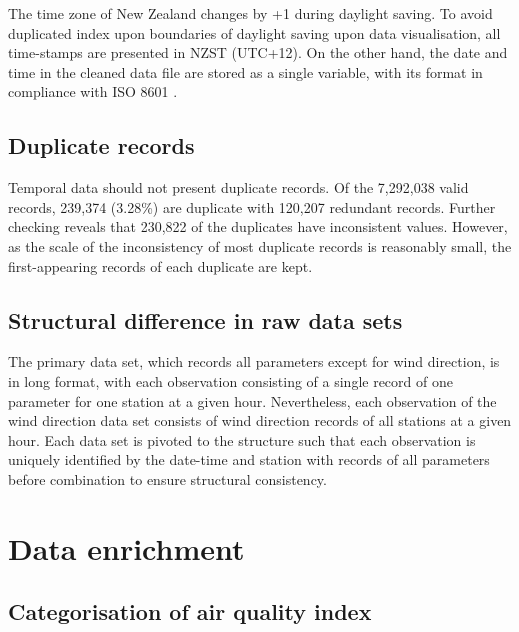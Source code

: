 \documentclass{aucklandthesis}
\begin{document}
The time zone of New Zealand changes by +1 during daylight saving. To avoid duplicated index upon boundaries of daylight saving upon data visualisation, all time-stamps are presented in NZST (UTC+12). On the other hand, the date and time in the cleaned data file are stored as a single variable, with its format in compliance with ISO 8601 \autocite{iso8601,readr}.

\hypertarget{duplicate-records}{%
\subsection{Duplicate records}\label{duplicate-records}}

Temporal data should not present duplicate records. Of the 7,292,038 valid records, 239,374 (3.28\%) are duplicate with 120,207 redundant records. Further checking reveals that 230,822 of the duplicates have inconsistent values. However, as the scale of the inconsistency of most duplicate records is reasonably small, the first-appearing records of each duplicate are kept.

\hypertarget{structural-difference-in-raw-data-sets}{%
\subsection{Structural difference in raw data sets}\label{structural-difference-in-raw-data-sets}}

The primary data set, which records all parameters except for wind direction, is in long format, with each observation consisting of a single record of one parameter for one station at a given hour. Nevertheless, each observation of the wind direction data set consists of wind direction records of all stations at a given hour. Each data set is pivoted to the structure such that each observation is uniquely identified by the date-time and station with records of all parameters before combination to ensure structural consistency.

\hypertarget{data-enrichment}{%
\section{Data enrichment}\label{data-enrichment}}

\hypertarget{categorisation-of-air-quality-index}{%
\subsection{Categorisation of air quality index}\label{categorisation-of-air-quality-index}}
\end{document}
